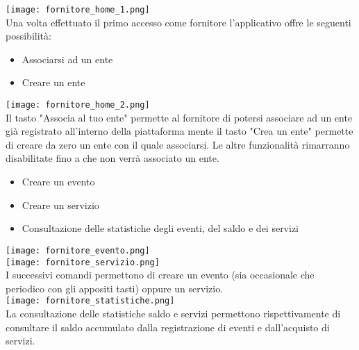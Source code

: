 \texttt{[image: fornitore\_home\_1.png]}\\
Una volta effettuato il primo accesso come fornitore l'applicativo offre le seguenti possibilità:
\begin{itemize}
    \item Associarsi ad un ente
    \item Creare un ente
\end{itemize}
\texttt{[image: fornitore\_home\_2.png]}\\
Il tasto "Associa al tuo ente" permette al fornitore di potersi associare ad un ente già registrato all'interno della piattaforma mente il tasto "Crea un ente" permette di creare da zero un ente con il quale associarsi. Le altre funzionalità rimarranno disabilitate fino a che non verrà associato un ente.
\begin{itemize}
    \item Creare un evento
    \item Creare un servizio
    \item Consultazione delle statistiche degli eventi, del saldo e dei servizi
\end{itemize}
\texttt{[image: fornitore\_evento.png]}\\
\texttt{[image: fornitore\_servizio.png]}\\
I successivi comandi permettono di creare un evento (sia occasionale che periodico con gli appositi tasti) oppure un servizio.\\
\texttt{[image: fornitore\_statistiche.png]}\\
La consultazione delle statistiche saldo e servizi permettono rispettivamente di consultare il saldo accumulato dalla registrazione di eventi e dall'acquisto di servizi.




